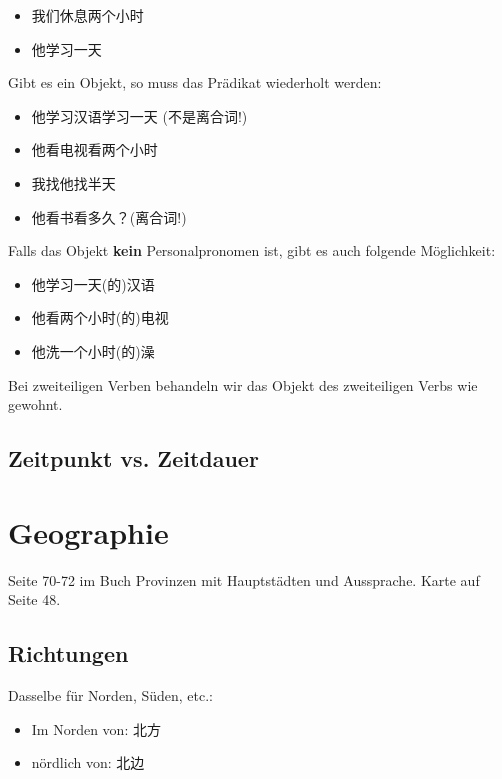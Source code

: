 \documentclass[UTF8]{ctexart}
\begin{document}
\begin{itemize}
    \item 我们休息两个小时
    \item 他学习一天
\end{itemize}

Gibt es ein Objekt, so muss das Prädikat wiederholt werden:

\begin{itemize}
    \item 他学习汉语学习一天 (不是离合词!)
    \item 他看电视看两个小时
    \item 我找他找半天
    \item 他看书看多久？(离合词!)
\end{itemize}

Falls das Objekt \textbf{kein} Personalpronomen ist, gibt es auch folgende Möglichkeit:

\begin{itemize}
    \item 他学习一天(的)汉语
    \item 他看两个小时(的)电视
    \item 他洗一个小时(的)澡
\end{itemize}

Bei zweiteiligen Verben behandeln wir das Objekt des zweiteiligen Verbs wie gewohnt.

\subsection{Zeitpunkt vs. Zeitdauer}



\section{Geographie}

Seite 70-72 im Buch Provinzen mit Hauptstädten und Aussprache. Karte auf Seite 48.


\subsection{Richtungen}

Dasselbe für Norden, Süden, etc.:

\begin{itemize}
    \item Im Norden von: 北方
    \item nördlich von: 北边
\end{itemize}
\end{document}
